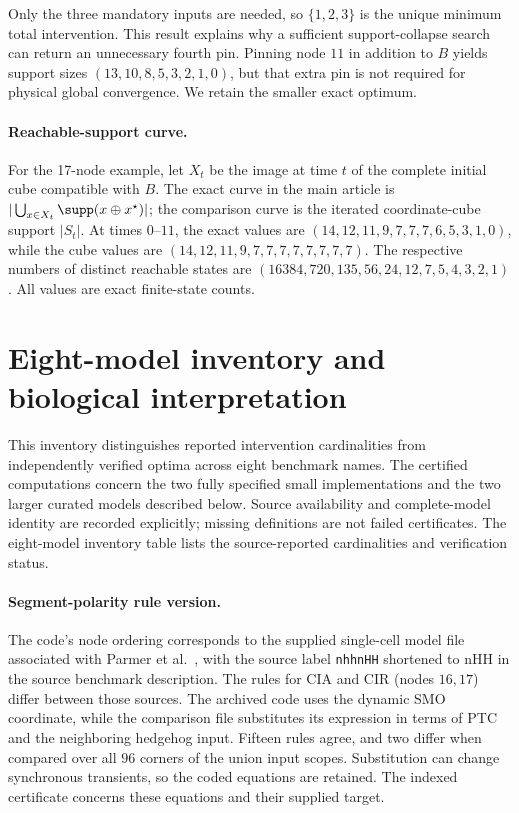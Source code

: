 Only the three mandatory inputs are needed, so $\{1,2,3\}$ is the unique
minimum total intervention. This result explains why a sufficient
support-collapse search can return an unnecessary fourth pin. Pinning
node $11$ in addition to $B$ yields support sizes
$(13,10,8,5,3,2,1,0)$, but that extra pin is not required for physical
global convergence. We retain the smaller exact optimum.

\paragraph{Reachable-support curve.}
For the 17-node example, let $X_t$ be the image at time $t$ of the
complete initial cube compatible with $B$. The exact curve in the main
article is $|\bigcup_{x\in X_t}\supp(x\oplus x^\star)|$; the comparison
curve is the iterated coordinate-cube support $|S_t|$. At times $0$--$11$,
the exact values are $(14,12,11,9,7,7,7,6,5,3,1,0)$, while the cube
values are $(14,12,11,9,7,7,7,7,7,7,7,7)$. The respective numbers of
distinct reachable states are
$(16384,720,135,56,24,12,7,5,4,3,2,1)$.
All values are exact finite-state counts.

\section{Eight-model inventory and biological interpretation}
\label{bio:source-qualifications}
This inventory distinguishes reported intervention cardinalities from
independently verified optima across eight benchmark names. The certified
computations concern the two fully specified small implementations and the two
larger curated models described below. Source availability and complete-model
identity are recorded explicitly; missing definitions are not failed certificates.
The eight-model inventory table lists the source-reported cardinalities and
verification status.




\paragraph{Segment-polarity rule version.}
\label{bio:cia-cir-comparison}
The code's node ordering corresponds to the supplied single-cell model
file associated with Parmer et al.\ \cite{Parmer2022}, with the source
label \texttt{nhhnHH} shortened to nHH in the source benchmark description.
The rules for CIA and CIR (nodes $16,17$) differ between those sources.
The archived code uses the dynamic SMO coordinate, while the comparison
file substitutes its expression in terms of PTC and the neighboring
hedgehog input. Fifteen rules agree, and two differ when compared over
all $96$ corners of the union input scopes. Substitution can change
synchronous transients, so the coded equations are retained. The indexed
certificate concerns these equations and their supplied target.

